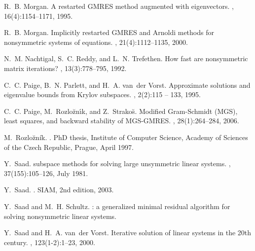 \documentclass{article}
\begin{document}
\begin{thebibliography}{100}
 R.~B. Morgan. \newblock A restarted {GMRES} method augmented with eigenvectors.
    ,
  16(4):1154--1171, 1995.


 R.~B. Morgan. \newblock Implicitly restarted {GMRES} and {Arnoldi} methods for
nonsymmetric
systems of equations.
,
21(4):1112--1135, 2000.





 N.~M. Nachtigal, S.~C. Reddy, and L.~N. Trefethen. \newblock How fast are
    nonsymmetric matrix iterations? ,
  13(3):778--795, 1992.

   C.~C. Paige, B.~N. Parlett, and H.~A. van~der Vorst. \newblock Approximate
  solutions and eigenvalue bounds from {Krylov} subspaces. , 2(2):115 -- 133,
1995.

 C.~C. Paige, M.~Rozlo{\u{z}}n{\'{\i}}k, and Z.~Strako{\u{s}}. \newblock
  Modified {G}ram-{S}chmidt ({MGS}), least squares, and backward
stability of {MGS-GMRES}.
,
28(1):264--284, 2006.

 M.~Rozlo\u{z}ník. .
    \newblock PhD thesis, Institute of Computer Science, Academy of Sciences of the
  Czech Republic, Prague, April 1997.


 Y.~Saad.  subspace methods for solving large unsymmetric linear
  systems.
, 37(155):105--126, July 1981.

	 Y.~Saad. . \newblock SIAM,
	2nd edition, 2003.
	
	 Y.~Saad and M.~H. Schultz. : a generalized minimal residual
    algorithm for solving
  nonsymmetric linear systems.

   Y.~Saad and H.~A. van~der Vorst. \newblock Iterative solution of linear systems in
    the 20th century. ,
  123(1-2):1--23, 2000.



\end{thebibliography}
\end{document}
